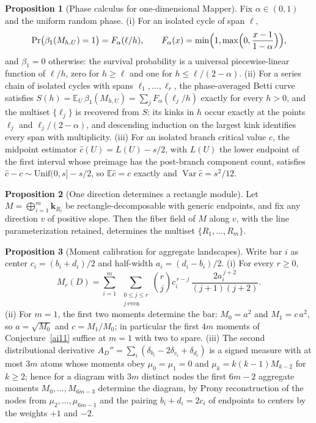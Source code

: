 \documentclass[11pt]{article}
\theoremstyle{definition}
\newcommand{\E}{\mathbb E}
\providecommand{\E}{\mathbb E}
\newtheorem{proposition}{Proposition}
\begin{document}
\begin{proposition}[Phase calculus for one-dimensional Mapper]\label{ai:map}
Fix $\alpha\in(0,1)$ and the uniform random phase.  (i) For an isolated cycle of span $\ell$,
\[
\Pr\bigl(\beta_1(M_{h,U})=1\bigr)=F_\alpha(\ell/h),\qquad
F_\alpha(x)=\min\Bigl(1,\max\Bigl(0,\frac{x-1}{1-\alpha}\Bigr)\Bigr),
\]
and $\beta_1=0$ otherwise: the survival probability is a universal piecewise-linear function of $\ell/h$, zero for $h\ge\ell$ and one for $h\le\ell/(2-\alpha)$.  (ii) For a series chain of isolated cycles with spans $\ell_1,\ldots,\ell_r$, the phase-averaged Betti curve satisfies $S(h)=\E_U\,\beta_1(M_{h,U})=\sum_jF_\alpha(\ell_j/h)$ exactly for every $h>0$, and the multiset $\{\ell_j\}$ is recovered from $S$: its kinks in $h$ occur exactly at the points $\ell_j$ and $\ell_j/(2-\alpha)$, and descending induction on the largest kink identifies every span with multiplicity.  (iii) For an isolated branch critical value $c$, the midpoint estimator $\widehat c(U)=L(U)-s/2$, with $L(U)$ the lower endpoint of the first interval whose preimage has the post-branch component count, satisfies $\widehat c-c\sim\mathrm{Unif}(0,s]-s/2$, so $\E\widehat c=c$ exactly and $\operatorname{Var}\widehat c=s^2/12$.
\end{proposition}

\begin{proposition}[One direction determines a rectangle module]\label{ai:rect}
Let $M=\bigoplus_{i=1}^m\mathbf k_{R_i}$ be rectangle-decomposable with generic endpoints, and fix any direction $v$ of positive slope.  Then the fiber field of $M$ along $v$, with the line parameterization retained, determines the multiset $\{R_1,\ldots,R_m\}$.
\end{proposition}

\begin{proposition}[Moment calibration for aggregate landscapes]\label{ai:sum}
Write bar $i$ as center $c_i=(b_i+d_i)/2$ and half-width $a_i=(d_i-b_i)/2$.  (i) For every $r\ge0$,
\[
M_r(D)=\sum_{i=1}^m\;\sum_{\substack{0\le j\le r\\ j\ \mathrm{even}}}\binom rj c_i^{\,r-j}\,\frac{2a_i^{\,j+2}}{(j+1)(j+2)}.
\]
(ii) For $m=1$, the first two moments determine the bar: $M_0=a^2$ and $M_1=c\,a^2$, so $a=\sqrt{M_0}$ and $c=M_1/M_0$; in particular the first $4m$ moments of Conjecture~\ref{ai11} suffice at $m=1$ with two to spare.  (iii) The second distributional derivative $A_D''=\sum_i(\delta_{b_i}-2\delta_{c_i}+\delta_{d_i})$ is a signed measure with at most $3m$ atoms whose moments obey $\mu_0=\mu_1=0$ and $\mu_k=k(k-1)M_{k-2}$ for $k\ge2$; hence for a diagram with $3m$ distinct nodes the first $6m-2$ aggregate moments $M_0,\ldots,M_{6m-3}$ determine the diagram, by Prony reconstruction of the nodes from $\mu_2,\ldots,\mu_{6m-1}$ and the pairing $b_i+d_i=2c_i$ of endpoints to centers by the weights $+1$ and $-2$.
\end{proposition}
\end{document}

